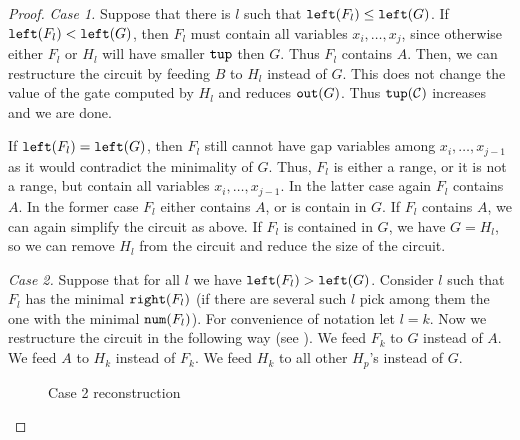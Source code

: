 \documentclass{toc}
\begin{document}
\begin{proof}[Proof]
    \emph{Case 1.} Suppose that there is $l$ such that $\texttt{left}(F_l) \leq \texttt{left}(G)$. If $\texttt{left}(F_l) < \texttt{left}(G)$, then $F_l$ must contain all variables $x_i, \ldots, x_j$, since otherwise either $F_l$ or $H_l$ will have smaller $\texttt{tup}$ then $G$. Thus $F_l$ contains $A$. Then, we can restructure the circuit by feeding $B$ to $H_l$ instead of $G$. This does not change the value of the gate computed by $H_l$ and reduces $\texttt{out}(G)$. Thus $\texttt{tup}({\cal C})$ increases and we are done.

    If $\texttt{left}(F_l) = \texttt{left}(G)$, then $F_l$ still cannot have gap variables among $x_i, \ldots, x_{j-1}$ as it would contradict the minimality of $G$. Thus, $F_l$ is either a range, or it is not a range, but contain all variables $x_i, \ldots, x_{j-1}$. In the latter case again $F_l$ contains $A$. In the former case $F_l$ either contains $A$, or is contain in $G$. If $F_l$ contains $A$, we can again simplify the circuit as above. If $F_l$ is contained in $G$, we have $G=H_l$, so we can remove $H_l$ from the circuit and reduce the size of the circuit.

    \emph{Case 2.} Suppose that for all $l$ we have $\texttt{left}(F_l)>\texttt{left}(G)$. Consider $l$ such that $F_l$ has the minimal $\texttt{right}(F_l)$ (if there are several such $l$ pick among them the one with the minimal $\texttt{num}(F_l)$). For convenience of notation let $l=k$. Now we restructure the circuit in the following way (see ). We feed $F_k$ to $G$ instead of $A$. We feed $A$ to $H_k$ instead of $F_k$. We feed $H_k$ to all other $H_p$'s instead of $G$.

    \begin{figure}[ht]
        \begin{center}
        \end{center}
        \caption{Case 2 reconstruction} \label{fig:after}
    \end{figure}


\end{proof}
\end{document}
